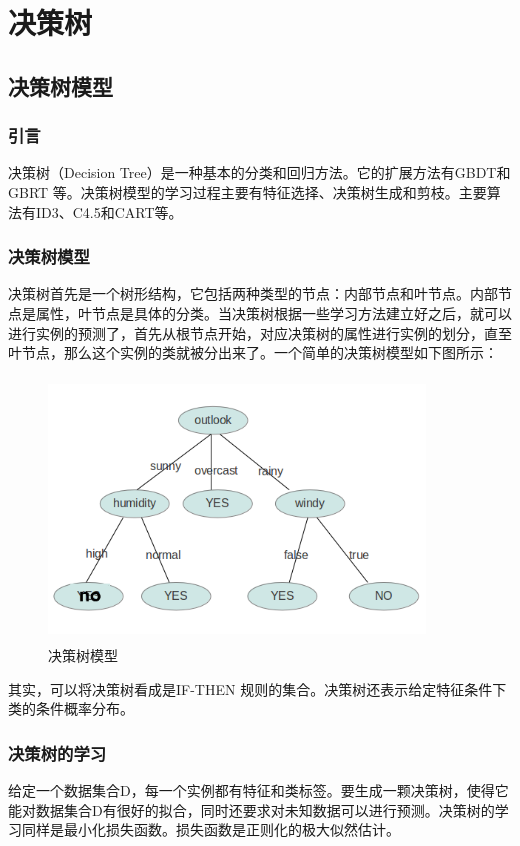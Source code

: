 \documentclass[a4paper,12pt]{book}
\begin{document}
    \chapter{决策树}
    \section{决策树模型}
    \subsection{引言}
    决策树（Decision Tree）是一种基本的分类和回归方法。它的扩展方法有GBDT和GBRT 等。决策树模型的学习过程主要有特征选择、决策树生成和剪枝。主要算法有ID3、C4.5和CART等。

    \subsection{决策树模型}

    决策树首先是一个树形结构，它包括两种类型的节点：内部节点和叶节点。内部节点是属性，叶节点是具体的分类。当决策树根据一些学习方法建立好之后，就可以进行实例的预测了，首先从根节点开始，对应决策树的属性进行实例的划分，直至叶节点，那么这个实例的类就被分出来了。一个简单的决策树模型如下图所示：
    \begin{figure}[h]
        \centering
        \includegraphics[width=10cm,height=7cm]{6_1}
        \caption{决策树模型}
    \end{figure}

    其实，可以将决策树看成是IF-THEN 规则的集合。决策树还表示给定特征条件下类的条件概率分布。

    \subsection{决策树的学习}

    给定一个数据集合D，每一个实例都有特征和类标签。要生成一颗决策树，使得它能对数据集合D有很好的拟合，同时还要求对未知数据可以进行预测。决策树的学习同样是最小化损失函数。损失函数是正则化的极大似然估计。
\end{document}
